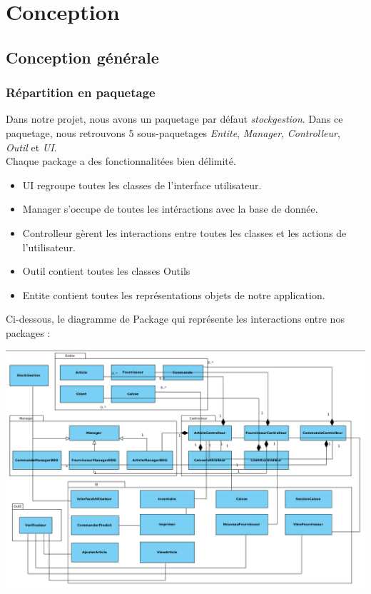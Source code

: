 \part{Conception}

\chapter{Conception générale}

\section{Répartition en paquetage}

Dans notre projet, nous avons un paquetage par défaut \textit{stockgestion}. Dans ce paquetage, nous retrouvons 5 sous-paquetages \textit{Entite}, \textit{Manager}, \textit{Controlleur}, \textit{Outil} et \textit{UI}.\\

Chaque package a des fonctionnalitées bien délimité. 
\begin{itemize}
	\item UI regroupe toutes les classes de l'interface utilisateur.
	\item Manager s'occupe de toutes les intéractions avec la base de donnée.
	\item Controlleur gèrent les interactions entre toutes les classes et les actions de l'utilisateur.
	\item Outil contient toutes les classes Outils
	\item Entite contient toutes les représentations objets de notre application.
\end{itemize}

Ci-dessous, le diagramme de Package qui représente les interactions entre nos packages :
\begin{center}
	\includegraphics[width=14cm]{Conception/DiagrammeDeClassePackage.png}
\end{center}

